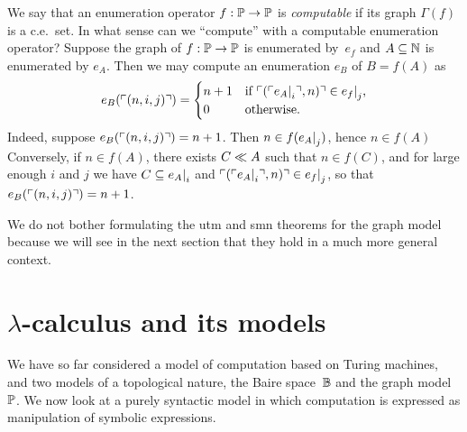 We say that an enumeration operator $f : \mathbb{P} \to \mathbb{P}$ is
\emph{computable} if its graph $\Gamma(f)$ is a c.e.~set. In what
sense can we ``compute'' with a computable enumeration operator?
Suppose the graph of $f : \mathbb{P} \to \mathbb{P}$ is enumerated by~$e_f$
and $A \subseteq \mathbb{N}$ is enumerated by $e_A$. Then we may compute an
enumeration $e_B$ of $B = f(A)$ as
%
\begin{equation*}
  e_B(\ulcorner (n, i, j) \urcorner) =
  \begin{cases}
    n + 1 & \text{if $\ulcorner (\ulcorner e_A{\mid}_{i} \urcorner, n) \urcorner \in
      e_f{\mid}_{j}$,}\\
    0 & \text{otherwise}.
  \end{cases}
\end{equation*}
%
Indeed, suppose $e_B(\ulcorner (n,i,j) \urcorner) = n + 1$. Then $n \in
f(e_A{\mid}_{j})$, hence $n \in f(A)$ Conversely, if $n \in
f(A)$, there exists $C \ll A$ such that $n \in f(C)$, and for large
enough $i$ and $j$ we have $C \subseteq e_A{\mid}_{i}$ and
$\ulcorner (\ulcorner e_A{\mid}_{i} \urcorner, n) \urcorner \in e_f{\mid}_{j}$, so
that $e_B(\ulcorner (n, i, j) \urcorner) = n + 1$.

We do not bother formulating the utm and smn theorems for the graph
model because we will see in the next section that they hold in a much
more general context.

\section{$\lambda$-calculus and its models}
\label{sec:lambda-calculus}


We have so far considered a model of computation based on Turing
machines, and two models of a topological nature, the Baire
space~$\mathbb{B}$ and the graph model~$\mathbb{P}$. We now look at a purely
syntactic model in which computation is expressed as manipulation of
symbolic expressions.

